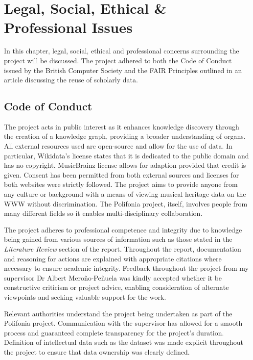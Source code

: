 \chapter{Legal, Social, Ethical \& Professional Issues} 
In this chapter, legal, social, ethical and professional concerns surrounding the project will be discussed. The project adhered to both the Code of Conduct issued by the British Computer Society \cite{bcs} and the FAIR Principles \cite{fairprinciples} outlined in an article discussing the reuse of scholarly data.

\section{Code of Conduct}
\hspace{0.5cm} The project acts in public interest as it enhances knowledge discovery through the creation of a knowledge graph, providing a broader understanding of organs. All external resources used are open-source and allow for the use of data. In particular, Wikidata's license \cite{wikidatalicense} states that it is dedicated to the public domain and has no copyright. MusicBrainz license \cite{musicbrainzlicense} allows for adaption provided that credit is given. Consent has been permitted from both external sources and licenses for both websites were strictly followed. The project aims to provide anyone from any culture or background with a means of viewing musical heritage data on the WWW without discrimination. The Polifonia project, itself, involves people from many different fields so it enables multi-disciplinary collaboration.  

The project adheres to professional competence and integrity due to knowledge being gained from various sources of information such as those stated in the \textit{Literature Review} section of the report. Throughout the report, documentation and reasoning for actions are explained with appropriate citations where necessary to ensure academic integrity. Feedback throughout the project from my supervisor Dr Albert Mero{\~n}o-Pe{\~n}uela was kindly accepted whether it be constructive criticism or project advice, enabling consideration of alternate viewpoints and seeking valuable support for the work.

Relevant authorities understand the project being undertaken as part of the Polifonia project. Communication with the supervisor has allowed for a smooth process and guaranteed complete transparency for the project's duration. Definition of intellectual data such as the dataset was made explicit throughout the project to ensure that data ownership was clearly defined.

